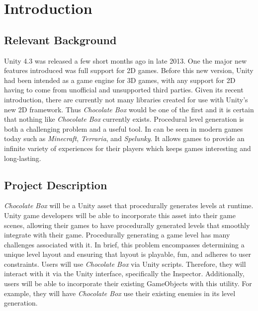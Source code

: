 \documentclass[pdftex,12pt,letter]{article}
\begin{document}
\section{Introduction}
\subsection{Relevant Background}
Unity 4.3 was released a few short months ago in late 2013. One the major new features introduced was full support for 2D games. Before this new version, Unity had been intended as a game engine for 3D games, with any support for 2D having to come from unofficial and unsupported third parties. Given its recent introduction, there are currently not many libraries created for use with Unity's new 2D framework. Thus \textit{Chocolate Box} would be one of the first and it is certain that nothing like \textit{Chocolate Box} currently exists. Procedural level generation is both a challenging problem and a useful tool. In can be seen in modern games today such as \textit{Minecraft}, \textit{Terraria}, and \textit{Spelunky}. It allows games to provide an infinite variety of experiences for their players which keeps games interesting and long-lasting.
\subsection{Project Description}
\textit{Chocolate Box} will be a Unity asset that procedurally generates levels at runtime. Unity game developers will be able to incorporate this asset into their game scenes, allowing their games to have procedurally generated levels that smoothly integrate with their game. Procedurally generating a game level has many challenges associated with it. In brief, this problem encompasses determining a unique level layout and ensuring that layout is playable, fun, and adheres to user constraints. Users will use \textit{Chocolate Box} via Unity scripts. Therefore, they will interact with it via the Unity interface, specifically the Inspector. Additionally, users will be able to incorporate their existing GameObjects with this utility. For example, they will have \textit{Chocolate Box} use their existing enemies in its level generation.
\end{document}
